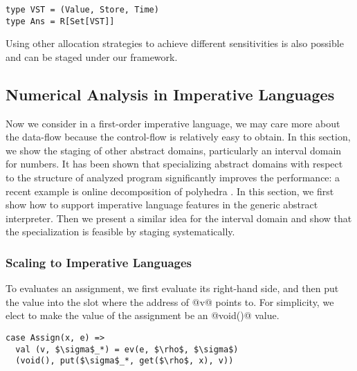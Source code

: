 \begin{lstlisting}
type VST = (Value, Store, Time)
type Ans = R[Set[VST]]
\end{lstlisting}

Using other allocation strategies to achieve different sensitivities is also possible \cite{DBLP:conf/icfp/Gilray0M16} 
and can be staged under our framework.
 



\subsection{Numerical Analysis in Imperative Languages} \label{cases_imp}

Now we consider in a first-order imperative language, we may care more about the data-flow because the control-flow
is relatively easy to obtain. In this section, we show the staging of other abstract domains, particularly an 
interval domain for numbers.
It has been shown that specializing abstract domains with respect to the structure of analyzed program significantly 
improves the performance: a recent example is online decomposition of polyhedra \cite{DBLP:conf/popl/SinghPV17, Singh:2017:PCD:3177123.3158143}.
In this section, we first show how to support imperative language features in the generic abstract interpreter.
Then we present a similar idea for the interval domain and show that the specialization is feasible by staging systematically.

\subsubsection{Scaling to Imperative Languages}

To evaluates an assignment, we first evaluate its right-hand side, and then put the value
into the slot where the address of @v@ points to.
For simplicity, we elect to make the value of the assignment be an @void()@ value.

\begin{lstlisting}
case Assign(x, e) =>
  val (v, $\sigma$_*) = ev(e, $\rho$, $\sigma$)
  (void(), put($\sigma$_*, get($\rho$, x), v))
\end{lstlisting}


